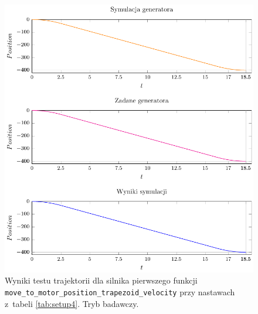 \documentclass[a4paper, 12pt]{article}
\begin{document}
	\begin{figure}[H]
		\centering
		\includegraphics[scale=1.1]{raport_graphs/simpMPVRrevers.pdf}
		\caption{Wyniki testu trajektorii dla silnika pierwszego funkcji \texttt{move\_to\_motor\_position\_trapezoid\_velocity} przy nastawach z~tabeli \ref{tab:setup4}. Tryb badawczy.}
		\label{fig:simpMPVRrevers}
	\end{figure}
	
\end{document}

